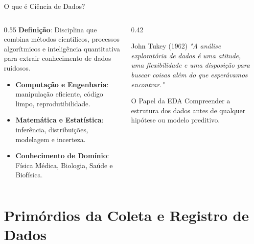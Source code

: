 \documentclass[aspectratio=169, 10pt]{beamer}
\begin{document}
\begin{frame}{O que é Ciência de Dados?}
  \begin{columns}
    \begin{column}{0.55\textwidth}
      \textbf{Definição}: Disciplina que combina métodos científicos, processos algorítmicos e inteligência quantitativa para extrair conhecimento de dados ruidosos.
      \begin{itemize}
        \item \textbf{Computação e Engenharia}: manipulação eficiente, código limpo, reprodutibilidade.
        \item \textbf{Matemática e Estatística}: inferência, distribuições, modelagem e incerteza.
        \item \textbf{Conhecimento de Domínio}: Física Médica, Biologia, Saúde e Biofísica.
      \end{itemize}
    \end{column}
    \begin{column}{0.42\textwidth}
      \begin{block}{John Tukey (1962)}
        \textit{"A análise exploratória de dados é uma atitude, uma flexibilidade e uma disposição para buscar coisas além do que esperávamos encontrar."}
      \end{block}
      \begin{exampleblock}{O Papel da EDA}
        Compreender a estrutura dos dados antes de qualquer hipótese ou modelo preditivo.
      \end{exampleblock}
    \end{column}
  \end{columns}
\end{frame}

\section{Primórdios da Coleta e Registro de Dados}
\end{document}
